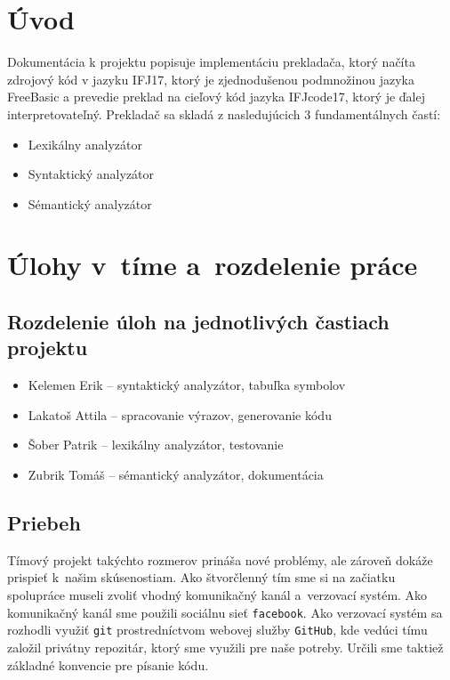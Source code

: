 \documentclass[a4paper, 12pt]{article}
\begin{document}
\tableofcontents
\newpage

\section{Úvod} \label{uvod}

Dokumentácia k projektu popisuje implementáciu prekladača, ktorý načíta zdrojový kód v jazyku IFJ17, ktorý je zjednodušenou podmnožinou jazyka FreeBasic a prevedie preklad na cieľový kód jazyka IFJcode17, ktorý je ďalej interpretovateľný. Prekladač sa skladá z nasledujúcich 3 fundamentálnych častí:

\begin{itemize}
	\item Lexikálny analyzátor
	\item Syntaktický analyzátor
	\item Sémantický analyzátor
\end{itemize}

\section{Úlohy v~tíme a~rozdelenie práce} \label{team}

\subsection{Rozdelenie úloh na jednotlivých častiach projektu}
\begin{itemize}
	\item Kelemen Erik -- syntaktický analyzátor, tabuľka symbolov
	\item Lakatoš Attila -- spracovanie výrazov, generovanie kódu
	\item Šober Patrik -- lexikálny analyzátor, testovanie
	\item Zubrik Tomáš -- sémantický analyzátor, dokumentácia

\end{itemize}

\subsection{Priebeh}
Tímový projekt takýchto rozmerov prináša nové problémy, ale zároveň dokáže prispieť k~našim skúsenostiam. Ako štvorčlenný tím sme si na začiatku spolupráce museli zvoliť vhodný komunikačný kanál a~verzovací systém. 
Ako komunikačný kanál sme použili sociálnu sieť \texttt{facebook}. 
Ako verzovací systém sa rozhodli využiť \texttt{git} prostredníctvom webovej služby \texttt{GitHub}, kde vedúci tímu založil privátny repozitár, ktorý sme využili pre naše potreby. 
Určili sme taktiež základné konvencie pre písanie kódu. 
\end{document}
